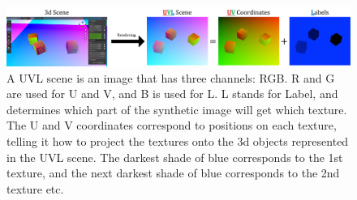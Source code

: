 \documentclass{article}
\begin{document}
\begin{figure}[H]
	\begin{center}
		\includegraphics[width=400pt]{../images/uvl_explanation_minimal.pdf}
	\end{center}
	\caption{
		A UVL scene is an image that has three channels: RGB.
		R and G are used for U and V, and B is used for L.
		L stands for Label, and determines which part of the synthetic image will get which texture.
		The U and V coordinates correspond to positions on each texture,
		telling it how to project the textures onto the 3d objects represented in the UVL scene.
		The darkest shade of blue corresponds to the 1st texture, and the next darkest shade of blue corresponds to the 2nd texture etc.
		}
	\label{fig:uvl_explanation}
\end{figure}





\end{document}
